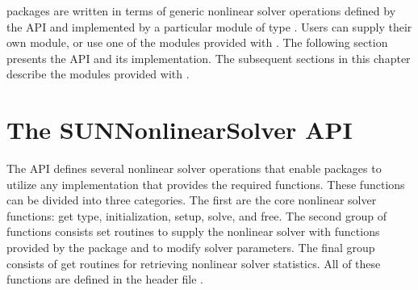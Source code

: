 {\sundials} packages are written in terms of generic nonlinear solver
operations defined by the {\sunnonlinsol} API and implemented by a
particular {\sunnonlinsol} module of type .
Users can supply their own {\sunnonlinsol} module, or use one of the
modules provided with {\sundials}. The following section presents the
{\sunnonlinsol} API and its implementation. The subsequent sections in
this chapter describe the {\sunnonlinsol} modules provided with
{\sundials}.


\section{The SUNNonlinearSolver API}
\label{s:sunnonlinsol_api}

The {\sunnonlinsol} API defines several nonlinear solver operations
that enable {\sundials} packages to utilize any {\sunnonlinsol}
implementation that provides the required functions. These functions
can be divided into three categories. The first are the core nonlinear
solver functions: get type, initialization, setup, solve, and free.
The second group of functions consists set routines to supply the
nonlinear solver with functions provided by the {\sundials} package
and to modify solver parameters. The final group consists of get
routines for retrieving nonlinear solver statistics. All of these
functions are defined in the header file
.

